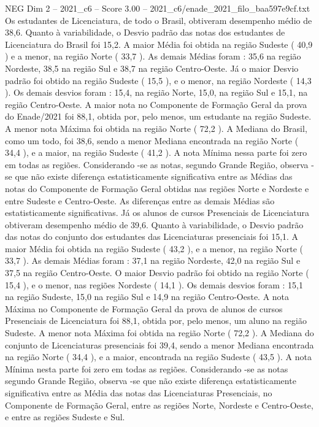 \begin{textsample}{NEG Dim 2 – 2021\_c6 – Score 3.00 – 2021\_c6/enade\_2021\_filo\_baa597e9cf.txt}
Os estudantes de Licenciatura, de todo o Brasil, obtiveram desempenho médio de 38,6.
Quanto à variabilidade, o Desvio padrão das notas dos estudantes de Licenciatura do Brasil foi 15,2.
A maior Média foi obtida na região Sudeste ( 40,9 ) e a menor, na região Norte ( 33,7 ).
As demais Médias foram : 35,6 na região Nordeste, 38,5 na região Sul e 38,7 na região Centro-Oeste.
Já o maior Desvio padrão foi obtido na região Sudeste ( 15,5 ), e o menor, na região Nordeste ( 14,3 ).
Os demais desvios foram : 15,4, na região Norte, 15,0, na região Sul e 15,1, na região Centro-Oeste.
A maior nota no Componente de Formação Geral da prova do Enade/2021 foi 88,1, obtida por, pelo menos, um estudante na região Sudeste.
A menor nota Máxima foi obtida na região Norte ( 72,2 ).
A Mediana do Brasil, como um todo, foi 38,6, sendo a menor Mediana encontrada na região Norte ( 34,4 ), e a maior, na região Sudeste ( 41,2 ).
A nota Mínima nessa parte foi zero em todas as regiões.
Considerando -se as notas, segundo Grande Região, observa -se que não existe diferença estatisticamente significativa entre as Médias das notas do Componente de Formação Geral obtidas nas regiões Norte e Nordeste e entre Sudeste e Centro-Oeste.
As diferenças entre as demais Médias são estatisticamente significativas.
Já os alunos de cursos Presenciais de Licenciatura obtiveram desempenho médio de 39,6.
Quanto à variabilidade, o Desvio padrão das notas do conjunto dos estudantes das Licenciaturas presenciais foi 15,1.
A maior Média foi obtida na região Sudeste ( 43,2 ), e a menor, na região Norte ( 33,7 ).
As demais Médias foram : 37,1 na região Nordeste, 42,0 na região Sul e 37,5 na região Centro-Oeste.
O maior Desvio padrão foi obtido na região Norte ( 15,4 ), e o menor, nas regiões Nordeste ( 14,1 ).
Os demais desvios foram : 15,1 na região Sudeste, 15,0 na região Sul e 14,9 na região Centro-Oeste.
A nota Máxima no Componente de Formação Geral da prova de alunos de cursos Presenciais de Licenciatura foi 88,1, obtida por, pelo menos, um aluno na região Sudeste.
A menor nota Máxima foi obtida na região Norte ( 72,2 ).
A Mediana do conjunto de Licenciaturas presenciais foi 39,4, sendo a menor Mediana encontrada na região Norte ( 34,4 ), e a maior, encontrada na região Sudeste ( 43,5 ).
A nota Mínima nesta parte foi zero em todas as regiões.
Considerando -se as notas segundo Grande Região, observa -se que não existe diferença estatisticamente significativa entre as Média das notas das Licenciaturas Presenciais, no Componente de Formação Geral, entre as regiões Norte, Nordeste e Centro-Oeste, e entre as regiões Sudeste e Sul.

\end{textsample}
